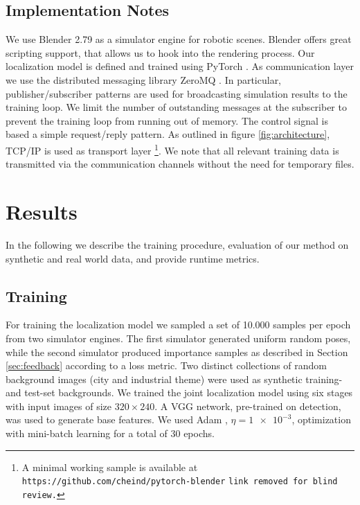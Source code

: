 \documentclass[conference]{IEEEtran}
\begin{document}
\subsection{Implementation Notes}
    We use Blender 2.79 \cite{blender} as a simulator engine for robotic scenes. Blender offers great scripting support, that allows us to hook into the rendering process. Our localization model is defined and trained using PyTorch \cite{paszke2017automatic}. As communication layer we use the distributed messaging library ZeroMQ \cite{zeromq_guide}. In particular, publisher/subscriber patterns are used for broadcasting simulation results to the training loop. We limit the number of outstanding messages at the subscriber to prevent the training loop from running out of memory. The control signal is based a simple request/reply pattern. As outlined in figure \ref{fig:architecture}, TCP/IP is used as transport layer \footnote{A minimal working sample is available at \iffinalcopy \texttt{https://github.com/cheind/pytorch-blender} \else \texttt{link removed for blind review.} \fi}. We note that all relevant training data is transmitted via the communication channels without the need for temporary files.

\section{Results}

    In the following we describe the training procedure, evaluation of our method on synthetic and real world data, and provide runtime metrics.

    \subsection{Training}
    For training the localization model we sampled a set of 10.000 samples per epoch from two simulator engines. The first simulator generated uniform random poses, while the second simulator produced importance samples as described in Section \ref{sec:feedback} according to a loss metric. Two distinct collections of random background images (city and industrial theme) were used as synthetic training- and test-set backgrounds. We trained the joint localization model using six stages with input images of size $320 \times 240$. A VGG network, pre-trained on detection, was used to generate base features. We used Adam \cite{kingma2014adam}, $\eta=\num{1e-3}$, optimization with mini-batch learning for a total of 30 epochs.
\end{document}
